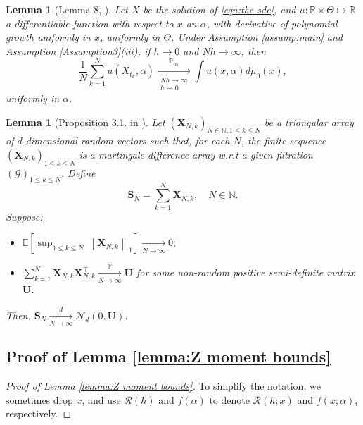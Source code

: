 \documentclass[a4paper,12pt]{article}
\numberwithin{equation}{section}
\theoremstyle{plain}
\newtheorem{lemma}[theorem]{Lemma}
\theoremstyle{definition}
\begin{document}
\begin{appendix}
\begin{lemma}[Lemma 8, \cite{kessler_estimation_1997}]\label{lemma:Kessler convergence}
Let $X$ be the solution of \eqref{eqn:the sde},
and 
$u:\mathbb{R}\times \Theta\mapsto \mathbb{R}$ a differentiable function with respect to $x$ an $\alpha$, with derivative of polynomial growth uniformly in $x$, uniformly in $\Theta$. 
    Under Assumption \ref{assump:main} and Assumption \ref{Assumption3}(iii), if $h\rightarrow0$ and $Nh\rightarrow\infty$, then
    \begin{equation*}
        \frac{1}{N}\sum_{k=1}^{N}u(X_{t_k},\alpha)\xrightarrow[\substack{N h\rightarrow\infty \\ h \rightarrow 0}]{\mathbb{P}_{\alpha_0}}\int u(x,\alpha)d\mu_0(x),
    \end{equation*}
    uniformly in $\alpha$.
\end{lemma}

\begin{lemma}[Proposition 3.1. in \cite{crimaldi2005convergence}]\label{prop:triangular asymptotic normal}
    Let $\left(\mathbf{X}_{N,k}\right)_{N\in \mathbb{N},1\leq k\leq N}$ be a triangular array of $d$-dimensional random vectors such that, for each $N$, the finite sequence $\left(\mathbf{X}_{N,k}\right)_{1\leq k\leq N}$ is a martingale difference array w.r.t a given filtration $(\mathcal{G})_{1\leq k\leq N}$. Define
    \begin{equation*}
        \mathbf{S}_N=\sum_{k=1}^N \mathbf{X}_{N,k},\quad N\in \mathbb{N}.
    \end{equation*}
    Suppose:
    \begin{itemize}
        \item[(i)] $\mathbb{E}\left[\sup _{1 \leq k \leq N}\left\|\mathbf{X}_{N, k}\right\|_1\right] \underset{N \rightarrow \infty}{\longrightarrow} 0 ;$
        \item[(ii)] $\sum_{k=1}^N \mathbf{X}_{N, k} \mathbf{X}_{N, k}^{\top} \xrightarrow[N \rightarrow \infty]{\mathbb{P}} \mathbf{U}$ for some non-random positive semi-definite matrix $\mathbf{U}$.
    \end{itemize}
    Then, $\mathbf{S}_N \underset{N \rightarrow \infty}{\stackrel{d}{\longrightarrow}} \mathcal{N}_d(0, \mathbf{U})$.
\end{lemma}
\subsection{Proof of Lemma \ref{lemma:Z moment bounds}}\label{proofLemmaZ}
\begin{proof}[Proof of Lemma \ref{lemma:Z moment bounds}]
    To simplify the notation, we sometimes drop $x$, and use $\mathcal{R}(h)$ and $f(\alpha)$ to denote $\mathcal{R}(h;x)$ and $f(x;\alpha)$, respectively.
    

\end{proof}
\end{appendix}
\end{document}
